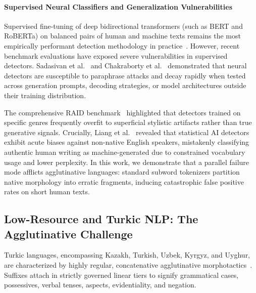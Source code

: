 \paragraph{Supervised Neural Classifiers and Generalization Vulnerabilities}
Supervised fine-tuning of deep bidirectional transformers (such as BERT and RoBERTa) on balanced pairs of human and machine texts remains the most empirically performant detection methodology in practice~\citep{solaiman2019release,uchendu2020authorship,ippolito2020automatic}. However, recent benchmark evaluations have exposed severe vulnerabilities in supervised detectors. Sadasivan et al.~\citep{sadasivan2023can} and Chakraborty et al.~\citep{chakraborty2023possibilities} demonstrated that neural detectors are susceptible to paraphrase attacks and decay rapidly when tested across generation prompts, decoding strategies, or model architectures outside their training distribution. 

The comprehensive RAID benchmark~\citep{wang2024raid} highlighted that detectors trained on specific genres frequently overfit to superficial stylistic artifacts rather than true generative signals. Crucially, Liang et al.~\citep{liang2023gptdetectors} revealed that statistical AI detectors exhibit acute biases against non-native English speakers, mistakenly classifying authentic human writing as machine-generated due to constrained vocabulary usage and lower perplexity. In this work, we demonstrate that a parallel failure mode afflicts agglutinative languages: standard subword tokenizers partition native morphology into erratic fragments, inducing catastrophic false positive rates on short human texts.

\subsection{Low-Resource and Turkic NLP: The Agglutinative Challenge}
Turkic languages, encompassing Kazakh, Turkish, Uzbek, Kyrgyz, and Uyghur, are characterized by highly regular, concatenative agglutinative morphotactics~\citep{oflazer1994twolevel,bekmanova2021kazakh}. Suffixes attach in strictly governed linear tiers to signify grammatical cases, possessives, verbal tenses, aspects, evidentiality, and negation.

